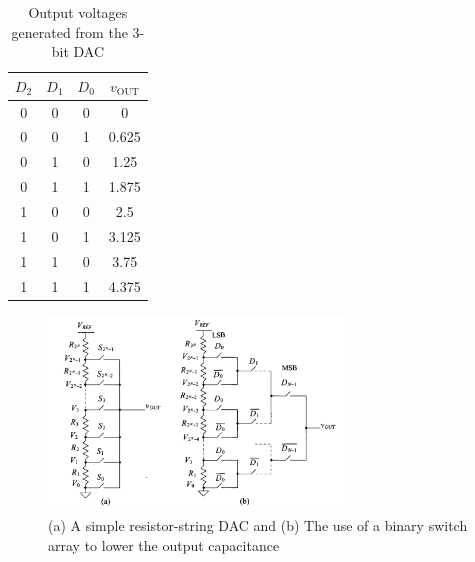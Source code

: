 \begin{center}
\begin{table}[H]
	\centering
	\label{tab:3bit_dac_output}
	\begin{tabular}{ccc|c}
		$D_2$ & $D_1$ & $D_0$ & $v_{\text{OUT}}$ \\
		\hline
		0 & 0 & 0 & 0 \\
		0 & 0 & 1 & 0.625 \\
		0 & 1 & 0 & 1.25 \\
		0 & 1 & 1 & 1.875 \\
		1 & 0 & 0 & 2.5 \\
		1 & 0 & 1 & 3.125 \\
		1 & 1 & 0 & 3.75 \\
		1 & 1 & 1 & 4.375 \\
	\end{tabular}
	\caption{Output voltages generated from the 3-bit DAC}
\end{table}
\end{center}
\begin{figure}[H]
	\centering
	\includegraphics[width=0.7\textwidth]{figs/resistor_style.png}
	\caption{(a) A simple resistor-string DAC and (b) The use of a binary switch
array to lower the output capacitance}
	\label{fig:resistor_style}
	\vspace{0.5cm}
\end{figure}

